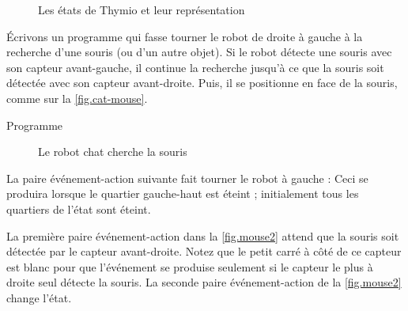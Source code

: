 

\begin{figure}
	\hfill
	\caption{Les états de Thymio et leur représentation}
\end{figure}


Écrivons un programme qui fasse tourner le robot de droite à gauche à la recherche d'une souris (ou d'un autre objet).
Si le robot détecte une souris avec son capteur avant-gauche, il continue la recherche jusqu'à ce que la souris soit détectée avec son capteur avant-droite.
Puis, il se positionne en face de la souris, comme sur la \cref{fig.cat-mouse}.

{\raggedleft \hfill Programme }

\begin{figure}
	\hfill
	\caption{Le robot chat cherche la souris}
\end{figure}

La paire événement-action suivante fait tourner le robot à gauche : 
Ceci se produira lorsque le quartier gauche-haut est éteint ; initialement tous les quartiers de l'état sont éteint.

La première paire événement-action dans la \cref{fig.mouse2} attend que la souris soit détectée par le capteur avant-droite.
Notez que le petit carré à côté de ce capteur est blanc pour que l'événement se produise seulement si le capteur le plus à droite seul détecte la souris.
La seconde paire événement-action de la \cref{fig.mouse2} change l'état.

